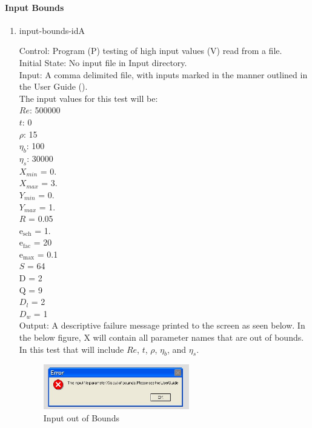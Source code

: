 \documentclass[12pt, titlepage]{article}
\newcounter{testcounter} %
\begin{document}
\paragraph{Input Bounds}

\begin{enumerate}			
					
\item{input-bounds-id\thetestcounter A \label{inputboundstest}\\}

Control: Program (P) testing of high input values (V) read from a file.\\
					
Initial State: No input file in Input directory.\\
					
Input: A comma delimited file, with inputs marked in the manner outlined in the
User Guide (\citet{LBM_UserGuide_PM}).\\The input values for this test will
be:\\$Re$: 500000\\
$t$: 0\\
$\rho$: 15\\
$\eta_b$: 100\\
$\eta_s$: 30000\\
$X_{min}$ = 0.\\
$X_{max}$ = 3.\\
$Y_{min}$ = 0.\\
$Y_{max}$ = 1.\\
$R$ = 0.05\\
$\mathrm{e_{sch}}$ = 1.\\
$\mathrm{e_{fac}}$ = 20\\
$\mathrm{e_{max}}$ = 0.1\\
$S$ = 64\\
$\mathrm{D}$ = 2\\
$\mathrm{Q}$ = 9\\
$D_{l}$ = 2\\
$D_{w}$ = 1\\
	
Output: A descriptive failure message printed to the screen as seen below. In
the below figure, X will contain all parameter names that are out of bounds. In
this test that will include $Re$, $t$, $\rho$, $\eta_b$, and $\eta_s$.

\begin{figure}[h!]
\begin{center}
\includegraphics[width=0.6\textwidth]{errorMessage.jpeg}
\caption{Input out of Bounds}
\label{Fig_InputError}
\end{center}
\end{figure}


\end{enumerate}
\end{document}

